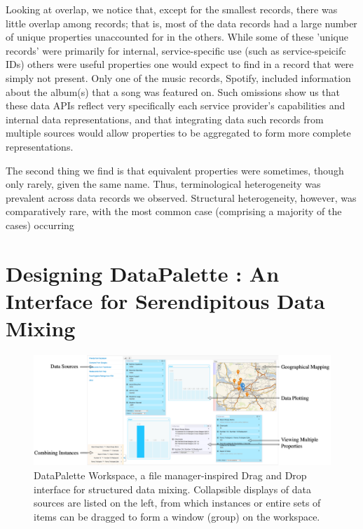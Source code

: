\documentclass{sigchi}
\begin{document}
Looking at overlap, we notice that, except for the smallest records, there was little overlap among records; that is, most of the data records had a large number of unique properties unaccounted for in the others.  While some of these 'unique records' were primarily for internal, service-specific use (such as service-speicifc IDs) others were useful properties one would expect to find in a record that were simply not present.  Only one of the music records, Spotify, included information about the album(s) that a song was featured on.  Such omissions show us that these data APIs reflect very specifically each service provider's capabilities and internal data representations, and that integrating data such records from multiple sources would allow properties to be aggregated to form more complete representations.

The second thing we find is that equivalent properties were sometimes, though only rarely, given the same name.  Thus, terminological heterogeneity was prevalent across data records we observed.  Structural heterogeneity, however, was comparatively rare, with the most common case (comprising a majority of the cases) occurring  

\section{Designing DataPalette : An Interface for Serendipitous Data Mixing}
\begin{figure}[tbp]
\begin{center}
\includegraphics[width=18cm]{img/screenshot}

\caption{DataPalette Workspace, a file manager-inspired Drag and Drop interface for structured data mixing. Collapsible displays of data sources are listed on the left, from which instances or entire sets of items can be dragged to form a window (group) on the workspace.}

\label{fig:workspace}
\end{center}
\end{figure}
\end{document}
